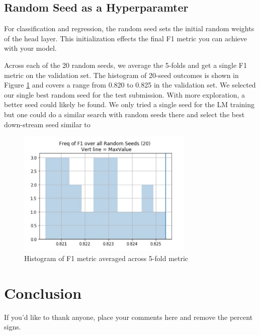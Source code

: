 \documentclass[smallextended]{svjour3}       %
\begin{document}
\subsection{Random Seed as a Hyperparamter}
\label{sec:rand_seeds}
For classification and regression, the random seed sets the initial random weights of the head layer. This initialization effects the final F1 metric you can achieve with your model.  

Across each of the 20 random seeds, we average the 5-folds and get a single F1 metric on the validation set.  The histogram of 20-seed outcomes is shown in Figure \ref{fig:random_seed_hist} and covers a range  from 0.820 to 0.825 in the validation set. We selected our single best random seed for the test submission. With more exploration, a better seed could likely be found.  We only tried a single seed for the LM training but one could do a similar search with random seeds there and select the best down-stream seed similar to \cite{poleval}

\begin{figure}[h]
	\includegraphics[width=0.75\textwidth]{seed_hist_f1}
	\caption{Histogram of F1 metric averaged across 5-fold metric}
	\label{fig:random_seed_hist}
\end{figure}


\section{Conclusion}
\label{sec:5}


\begin{acknowledgements}
If you'd like to thank anyone, place your comments here
and remove the percent signs.
\end{acknowledgements}
\end{document}
